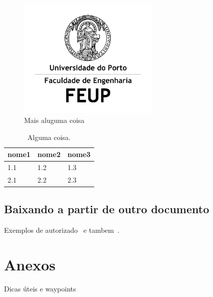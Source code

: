 \documentclass[a4paper, 12pt, twoside]{scrreprt}
\begin{document}
\begin{figure}[!htb]
\centering
\includegraphics[width=0.60\textwidth]{FEUP_Logo}
\caption[alguma coisa.]{Mais aluguma coisa} \label{fig:Array}
\end{figure}

\begin{table}[htb]
\centering
\caption{Alguma coisa.}
     \sffamily \begin{tabularx}{1.0\textwidth}{ p{5cm}  p{5cm}  p{5cm} }
    \hline
   \textbf{nome1} \hfill & \textbf{nome2} \hfill & \textbf{nome3} \\ \hline
    1.1 & 1.2 & 1.3\\
    2.1 & 2.2 & 2.3\\ \hline
    \end{tabularx} \normalfont
\label{table:Emissivity}
\end{table}

\section{Baixando a partir de outro documento}
Exemplos de autorizado~\cite{dirac} e tambem~\cite{einstein}.



%
%
\printbibliography[heading=bibintoc] %


%
%
\appendix
\renewcommand{\chaptername}{Anexos}
\chapter{Anexos}
Dicas úteis e waypoints
\end{document}
